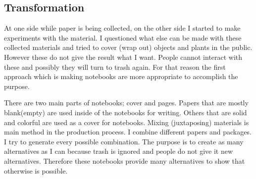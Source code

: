 





\subsection{Transformation}
At one side while paper is being collected, on the other side I started to make experiments with the material. I questioned what else can be made with these collected materials and tried to cover (wrap out) objects and plants in the public. However these do not give the result what I want. People cannot interact with these and possibly they will turn to trash again. For that reason the first approach which is making notebooks are more appropriate to accomplish the purpose.


There are two main parts of notebooks; cover and pages. Papers that are mostly blank(empty) are used inside of the notebooks for writing. Others that are solid and colorful are used as a cover for notebooks. Mixing (juxtaposing) materials is main method in the production process. I combine different papers and packages. I try to generate every possible combination. The purpose is to create as many alternatives as I can because trash is ignored and people do not give it new alternatives. Therefore these notebooks provide many alternatives to show that otherwise is possible. 

